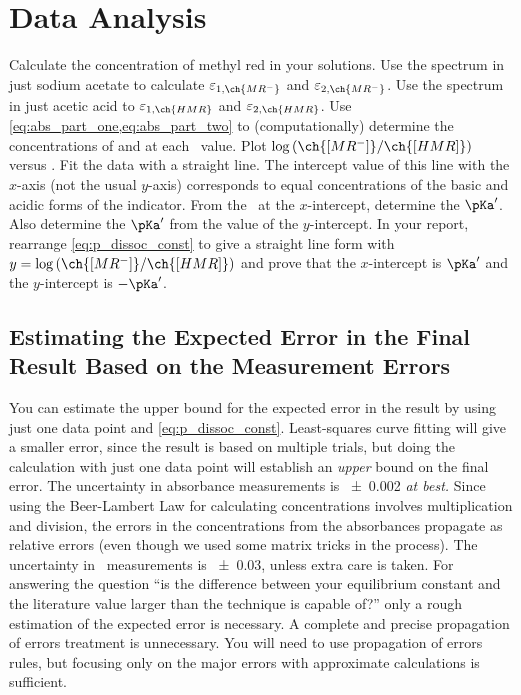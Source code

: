 \section{Data Analysis}
\label{sec:data_analysis}

Calculate the concentration of methyl red in your solutions. 
Use the spectrum in just sodium acetate to calculate \(\varepsilon_{1, \ch{MR^-}}\) and \(\varepsilon_{2, \ch{MR^-}}\).
Use the spectrum in just acetic acid to \(\varepsilon_{1, \ch{HMR}}\) and \(\varepsilon_{2, \ch{HMR}}\).
Use \cref{eq:abs_part_one,eq:abs_part_two} to (computationally) determine the concentrations of  and  at each \pH\ value. 
Plot \(\log{(\ch{[MR^-]}/\ch{[HMR]})}\) versus \pH. 
Fit the data with a straight line. 
The intercept value of this line with the \(x\)-axis (not the usual \(y\)-axis) corresponds to equal concentrations of the basic and acidic forms of the indicator. 
From the \pH\ at the \(x\)-intercept, determine the \(\pKa'\). Also determine the \(\pKa'\) from the value of the \(y\)-intercept. 
In your report, rearrange \cref{eq:p_dissoc_const} to give a straight line form with \(y = \log{(\ch{[MR^-]}/\ch{[HMR]})}\) and prove that the \(x\)-intercept is \(\pKa'\) and the \(y\)-intercept is \(-\pKa'\). 

\subsection{Estimating the Expected Error in the Final Result Based on the Measurement Errors}
\label{subs:estimating_final_error_based_on_measurement_errors}

You can estimate the upper bound for the expected error in the result by using just one data point and \cref{eq:p_dissoc_const}. 
Least-squares curve fitting will give a smaller error, since the result is based on multiple trials, but doing the calculation with just one data point will establish an \emph{upper} bound on the final error. 
The uncertainty in absorbance measurements is \num{\pm0.002} \emph{at best.} 
Since using the Beer-Lambert Law for calculating concentrations involves multiplication and division, the errors in the concentrations from the absorbances propagate as relative errors (even though we used some matrix tricks in the process). 
The uncertainty in \pH\ measurements is \num{\pm0.03}, unless extra care is taken. 
For answering the question ``is the difference between your equilibrium constant and the literature value larger than the technique is capable of?'' only a rough estimation of the expected error is necessary. 
A complete and precise propagation of errors treatment is unnecessary. 
You will need to use propagation of errors rules, but focusing only on the major errors with approximate calculations is sufficient. 

